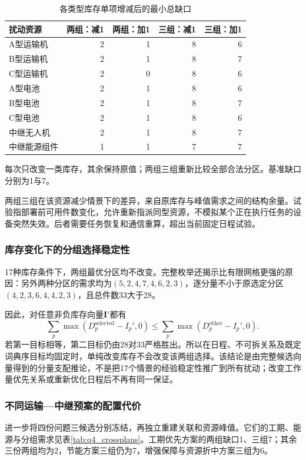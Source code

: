 \documentclass[withoutpreface,colorprint]{format}
\numberwithin{equation}{section}
\numberwithin{figure}{section}
\numberwithin{table}{section}
\begin{document}
\begin{table}[htbp]\centering\small
\caption{各类型库存单项增减后的最小总缺口}\label{tab:q4_inventory_stress}
\begin{tabular}{@{}lrrrr@{}}
\toprule
扰动资源 & 两组：减1 & 两组：加1 & 三组：减1 & 三组：加1\\
\midrule
A型运输机 & 2 & 1 & 8 & 6\\
B型运输机 & 2 & 1 & 8 & 7\\
C型运输机 & 2 & 0 & 8 & 6\\
A型电池 & 2 & 1 & 8 & 6\\
B型电池 & 2 & 1 & 8 & 7\\
C型电池 & 2 & 1 & 8 & 6\\
中继无人机 & 2 & 1 & 8 & 7\\
中继能源组件 & 1 & 1 & 7 & 7\\
\bottomrule
\end{tabular}
\par\smallskip\parbox{.96\linewidth}{\footnotesize 每次只改变一类库存，其余保持原值；两组三组重新比较全部合法分区。基准缺口分别为1与7。}
\end{table}


两组三组在该资源减少情景下的差异，来自原库存与峰值需求之间的结构余量。试验指部署前可用件数变化，允许重新指派同型资源，不模拟某个正在执行任务的设备突然失效。后者需要任务恢复和通信重算，超出当前固定日程试验。

\subsubsection{库存变化下的分组选择稳定性}
17种库存条件下，两组最优分区均不改变。完整枚举还揭示比有限网格更强的原因：另外两种分区的需求均为$(5,2,4,7,4,6,2,3)$，逐分量不小于原选定分区$(4,2,3,6,4,4,2,3)$，且总件数33大于28。

因此，对任意非负库存向量$\boldsymbol I'$都有
\begin{equation}
 \sum_p\max(D_p^{\mathrm{selected}}-I_p',0)
 \le\sum_p\max(D_p^{\mathrm{other}}-I_p',0).
\label{eq:q4_inventory_dominance}
\end{equation}
若第一目标相等，第二目标仍由28对33严格胜出。所以在日程、不可拆关系及既定词典序目标均固定时，单纯改变库存不会改变该两组选择。该结论是由完整候选向量得到的分量支配推论，不是把17个情景的经验稳定性推广到所有扰动；改变工作量优先关系或重新优化日程后不再有同一保证。

\subsubsection{不同运输—中继预案的配置代价}
进一步将四份问题三候选分别冻结，再独立重建关联和资源峰值。它们的工期、能源与分组需求见表\ref{tab:q4_crossplans}。工期优先方案的两组缺口1、三组7；其余三份两组均为2，节能方案三组仍为7，增强保障与资源折中方案三组为6。
\end{document}
